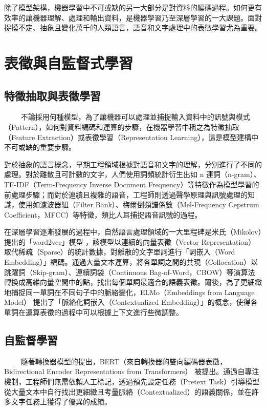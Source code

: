 除了模型架構，機器學習中不可或缺的另一大部分是對資料的編碼過程。如何更有效率的讓機器理解、處理和輸出資料，是機器學習乃至深層學習的一大課題。面對捉摸不定、抽象且變化萬千的人類語言，語音和文字處理中的表徵學習尤為重要。
\section{表徵與自監督式學習}

\subsection{特徵抽取與表徵學習}
　　
不論採用何種模型，為了讓機器可以處理並捕捉輸入資料中的訊號與模式（Pattern），如何對資料編碼和運算的步驟，在機器學習中稱之為特徵抽取（Feature Extraction）或表徵學習（Representation Learning），這是模型建構中不可或缺的重要步驟。

對於抽象的語言概念，早期工程領域根據對語音和文字的理解，分別進行了不同的處理。對於離散且可計數的文字，人們使用詞頻統計衍生出如 n 連詞（n-gram）、TF-IDF（Term-Frequency Inverse Document Frequency）等特徵作為模型學習的前處理步驟；而對於連續且複雜的語音，工程師則透過聲學原理與訊號處理的知識，使用如濾波器組（Filter Bank）、梅爾倒頻譜係數（Mel-Frequency Cepstrum Coefficient，MFCC）等特徵，類比人耳捕捉語音訊號的過程。

在深層學習逐漸發展的過程中，自然語言處理領域的一大里程碑是米氏（Mikolov）提出的「word2vec」模型 \cite{mikolov_efficient_2013}，該模型以連續的向量表徵（Vector Representation）取代稀疏（Sparse）的統計數據，對離散的文字單詞進行「詞嵌入（Word Embedding）」編碼。通過大量文本運算，將各單詞之間的共現（Collocation）以跳躍詞（Skip-gram）、連續詞袋（Continuous Bag-of-Word，CBOW）等演算法轉換成高維向量空間中的點，找出每個單詞最適合的語義表徵。爾後，為了更細緻地捕捉同一單詞在不同句子中的脈絡變化，ELMo（Embeddings from Language Model）\cite{peters_deep_2018} 提出了「脈絡化詞嵌入（Contextualized Embedding）」的概念，使得各單詞在運算表徵的過程中可以根據上下文進行些微調整。

\subsection{自監督學習}
　　
隨著轉換器模型的提出，BERT（來自轉換器的雙向編碼器表徵，Bidirectional Encoder Representations from Transformers）\cite{devlin_bert_2019} 被提出。通過自專注機制，工程師們無需依賴人工標記，透過預先設定任務（Pretext Task）引導模型從大量文本中自行找出更細緻且考量脈絡（Contextualized）的語義關係，並在許多文字任務上獲得了優異的成績。

